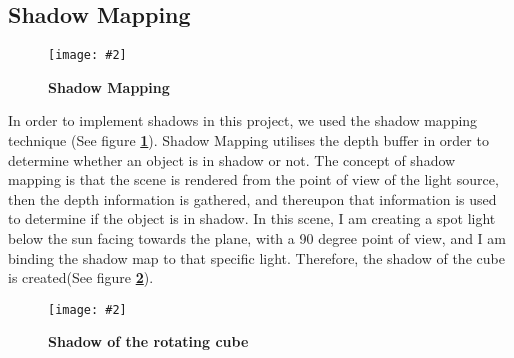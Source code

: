 \documentclass[10pt, a4paper]{article}
\newcommand{\figuremacro}[5]{
    \begin{figure}[#1]
        \centering
        \texttt{[image: \#2]}
        \caption[#3]{\textbf{#3}#4}
        \label{fig:#2}
    \end{figure}
}
\begin{document}
\subsection{Shadow Mapping}

	\figuremacro{H}{Shadow_Explanation}{Shadow Mapping}{ }{1.0}
	
	In order to implement shadows in this project, we used the shadow mapping technique (See figure \textbf{\ref{fig:Shadow_Explanation}}). Shadow Mapping utilises the depth buffer in order to determine whether an object is in shadow or not. The concept of shadow mapping is that the scene is rendered from the point of view of the light source, then the depth information is gathered, and thereupon that information is used to determine if the object is in shadow. In this scene, I am creating a spot light below the sun facing towards the plane, with a 90 degree point of view, and I am binding the shadow map to that specific light. Therefore, the shadow of the cube is created(See figure \textbf{\ref{fig:Cube_Shadow}}).
	
	
	\figuremacro{H}{Cube_Shadow}{Shadow of the rotating cube}{ }{1.0}






		
\end{document}
